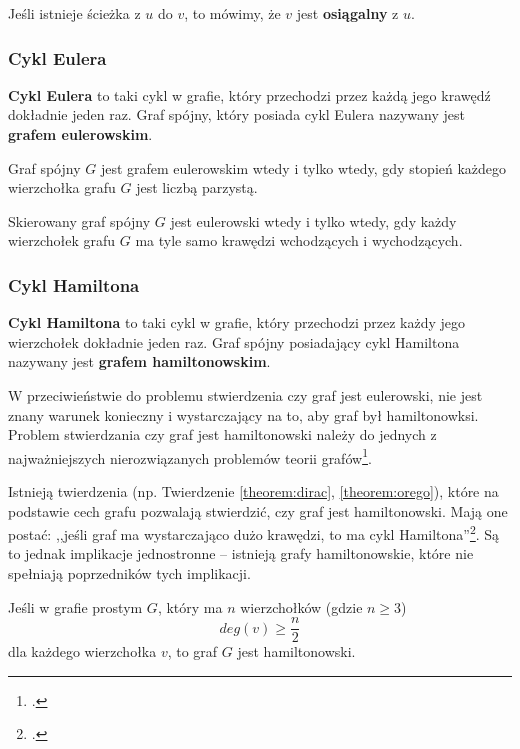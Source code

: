 Jeśli istnieje ścieżka z $u$ do $v$, to mówimy, że $v$ jest \textbf{osiągalny} z $u$.

\subsubsection*{Cykl Eulera}

\textbf{Cykl Eulera} to taki cykl w grafie, który przechodzi przez każdą jego krawędź dokładnie jeden raz. Graf spójny, który posiada cykl Eulera nazywany jest \textbf{grafem eulerowskim}. 

\begin{theorem}[Euler, 1736]
Graf spójny $G$ jest grafem eulerowskim wtedy i tylko wtedy, gdy stopień każdego wierzchołka grafu $G$ jest liczbą parzystą.
\end{theorem}

\begin{theorem}
Skierowany graf spójny $G$ jest eulerowski wtedy i tylko wtedy, gdy każdy wierzchołek grafu $G$ ma tyle samo krawędzi wchodzących i wychodzących.
\end{theorem}
	
\subsubsection*{Cykl Hamiltona}

\textbf{Cykl Hamiltona} to taki cykl w grafie, który przechodzi przez każdy jego wierzchołek dokładnie jeden raz. Graf spójny posiadający cykl Hamiltona nazywany jest \textbf{grafem hamiltonowskim}.

W przeciwieństwie do problemu stwierdzenia czy graf jest eulerowski, nie jest znany warunek konieczny i wystarczający na to, aby graf był hamiltonowksi. Problem stwierdzania czy graf jest hamiltonowski należy do jednych z najważniejszych nierozwiązanych problemów teorii grafów\footcite[54]{wilson}. 

Istnieją twierdzenia (np. Twierdzenie \ref{theorem:dirac}, \ref{theorem:orego}), które na podstawie cech grafu pozwalają stwierdzić, czy graf jest hamiltonowski. Mają one postać: ,,jeśli graf ma wystarczająco dużo krawędzi, to ma cykl Hamiltona''\footcite[54]{wilson}. Są to jednak implikacje jednostronne -- istnieją grafy hamiltonowskie, które nie spełniają poprzedników tych implikacji. 

\begin{theorem}[Dirac, 1952]\label{theorem:dirac}
Jeśli w grafie prostym $G$, który ma $n$ wierzchołków (gdzie $n \geq 3$)
\[deg(v) \geq \frac{n}{2}\] 
dla każdego wierzchołka $v$, to graf $G$ jest hamiltonowski.
\end{theorem}

